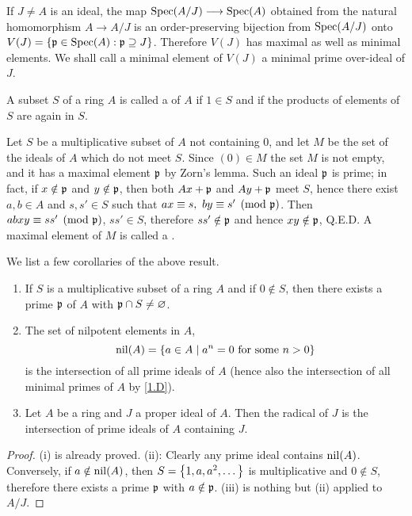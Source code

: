 \documentclass[../main]{subfiles}
\begin{document}
If $J\ne A$ is an ideal, the map $\operatorname{Spec}(A/J)\longrightarrow\operatorname{Spec}(A)$ obtained from the natural homomorphism $A\longrightarrow A/J$ is an order-preserving bijection from $\operatorname{Spec}(A/J)$ onto $V(J)=\left\{\mathfrak{p}\in\operatorname{Spec}(A): \mathfrak{p}\supseteq J\right\}$. Therefore $V(J)$ has maximal as well as minimal elements. We shall call a minimal element of $V(J)$ a minimal prime over-ideal of $J$.

\newparagraph
A subset $S$ of a ring $A$ is called a  of $A$ if $1\in S$ and if the products of elements of $S$ are again in $S$.

Let $S$ be a multiplicative subset of $A$ not containing 0, and let $M$ be the set of the ideals of $A$ which do not meet $S$. Since $(0)\in M$ the set $M$ is not empty, and it has a maximal element $\mathfrak{p}$ by Zorn's lemma. Such an ideal $\mathfrak{p}$ is prime; in fact, if $x\notin\mathfrak{p}$ and $y\notin\mathfrak{p}$, then both $Ax+\mathfrak{p}$ and $Ay+\mathfrak{p}$ meet $S$, hence there exist $a,b\in A$ and $s,s'\in S$ such that $ax\equiv s,~by\equiv s'\pmod{\mathfrak{p}}$. Then $abxy\equiv ss'\pmod{\mathfrak{p}}$, $ss'\in S$, therefore $ss'\notin\mathfrak{p}$ and hence $xy\notin\mathfrak{p}$, Q.E.D. A maximal element of $M$ is called a .

We list a few corollaries of the above result.
\begin{enumerate}[label=(\roman*)]

    \item If $S$ is a multiplicative subset of a ring $A$ and if $0\notin S$, then there exists a prime $\mathfrak{p}$ of $A$ with $\mathfrak{p}\cap S\ne\varnothing$.
    
    \item The set of nilpotent elements in $A$, \[\operatorname{nil}(A) = \left\{a\in A \mid a^n=0 \text{ for some }n>0\right\}\] is the intersection of all prime ideals of $A$ (hence also the intersection of all minimal primes of $A$ by \ref{1.D}).
    
    \item Let $A$ be a ring and $J$ a proper ideal of $A$. Then the radical of $J$ is the intersection of prime ideals of $A$ containing $J$.
    
\end{enumerate}

\begin{proof}
(i) is already proved. (ii): Clearly any prime ideal contains $\operatorname{nil}(A)$. Conversely, if $a\notin\operatorname{nil}(A)$, then $S=\left\{1,a,a^2,\dots\right\}$ is multiplicative and $0\notin S$, therefore there exists a prime $\mathfrak{p}$ with $a\notin\mathfrak{p}$. (iii) is nothing but (ii) applied to $A/J$.
\end{proof}
\end{document}

